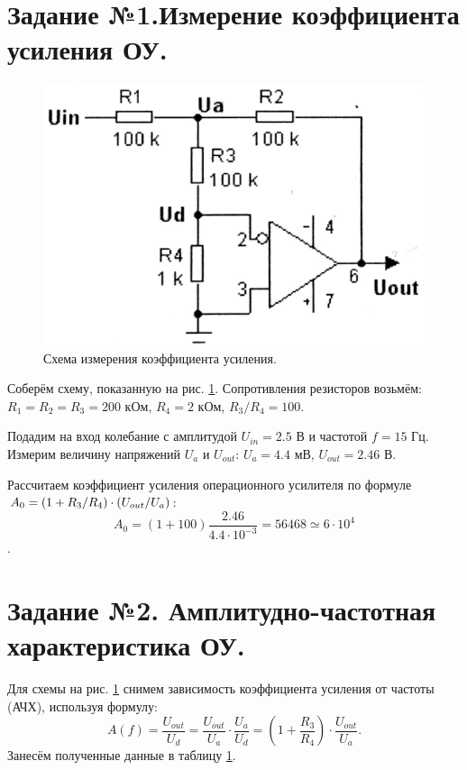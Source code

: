 \documentclass[a4paper, 12pt, twoside]{article}
\newcommand*{\hm}[1]{#1\nobreak\discretionary{}
	{\hbox{$\mathsurround=0pt #1$}}{}}
\begin{document}
\section*{Задание №1.Измерение коэффициента усиления ОУ.}

\begin{figure}[H]
	\centering
	\includegraphics[width =  0.3\linewidth]{kus}
	\caption{Схема измерения коэффициента усиления.}
	\label{kus}

\end{figure}


Соберём схему, показанную на рис. \ref{kus}. Сопротивления резисторов возьмём: $R_1=R_2=R_3=200$ кОм, $R_4 = 2$ кОм, $R_3/R_4 = 100$.
\vspace{\baselineskip}

Подадим на вход колебание с амплитудой $U_{in} = 2.5$ В и частотой $f = 15$ Гц. Измерим величину напряжений $U_a$ и $U_{out}$: $U_a = 4.4 $ мВ, $U_{out} = 2.46$ В. 

\vspace{\baselineskip}

Рассчитаем коэффициент усиления операционного усилителя по формуле $A_0 = (1 \hm{+}R_3/R_4)\cdot (U_{out}/U_a)$:
$$A_0 = (1 + 100)\dfrac{2.46}{4.4\cdot 10^{-3}} = 56468  \simeq 6 \cdot 10^4$$.

\section*{Задание №2. Амплитудно-частотная характеристика ОУ.}

Для схемы на рис. \ref{kus} снимем зависимость коэффициента усиления от частоты (АЧХ), используя формулу: $$A(f) = \dfrac{U_{out}}{U_d} = \dfrac{U_{out}}{U_a}\cdot \dfrac{U_a}{U_d} = \left(1+\dfrac{R_3}{R_4}\right )\cdot \dfrac{U_{out}}{U_a}.$$
Занесём полученные данные в таблицу \ref{kus}.
\end{document}
